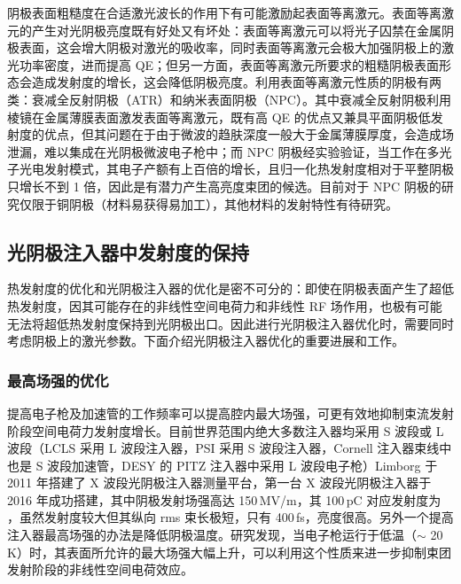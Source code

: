 阴极表面粗糙度在合适激光波长的作用下有可能激励起表面等离激元\cite{Novotny:2012aa}。表面等离激元的产生对光阴极亮度既有好处又有坏处：表面等离激元可以将光子囚禁在金属阴极表面，这会增大阴极对激光的吸收率，同时表面等离激元会极大加强阴极上的激光功率密度，进而提高 QE；但另一方面，表面等离激元所要求的粗糙阴极表面形态会造成发射度的增长，这会降低阴极亮度。利用表面等离激元性质的阴极有两类：衰减全反射阴极（ATR）和纳米表面阴极（NPC）。其中衰减全反射阴极利用棱镜在金属薄膜表面激发表面等离激元，既有高 QE 的优点又兼具平面阴极低发射度的优点，但其问题在于由于微波的趋肤深度一般大于金属薄膜厚度，会造成场泄漏，难以集成在光阴极微波电子枪中\cite{Watanabe:2011aa,Neo:2012aa}；而 NPC 阴极经实验验证，当工作在多光子光电发射模式\cite{Musumeci:2010aa}，其电子产额有上百倍的增长，且归一化热发射度相对于平整阴极只增长不到 1 倍\cite{Polyakov:2013ab,Li:2013ac}，因此是有潜力产生高亮度束团的候选。目前对于 NPC 阴极的研究仅限于铜阴极（材料易获得易加工），其他材料的发射特性有待研究。

\subsection{光阴极注入器中发射度的保持}
热发射度的优化和光阴极注入器的优化是密不可分的：即使在阴极表面产生了超低热发射度，因其可能存在的非线性空间电荷力和非线性 RF 场作用，也极有可能无法将超低热发射度保持到光阴极出口。因此进行光阴极注入器优化时，需要同时考虑阴极上的激光参数。下面介绍光阴极注入器优化的重要进展和工作。

\subsubsection{最高场强的优化}
提高电子枪及加速管的工作频率可以提高腔内最大场强，可更有效地抑制束流发射阶段空间电荷力发射度增长。目前世界范围内绝大多数注入器均采用 S 波段或 L 波段（LCLS 采用 L 波段注入器\cite{Zhou:2015aa}，PSI 采用 S 波段注入器\cite{prat2014emittance}，Cornell 注入器束线中也是 S 波段加速管\cite{Bartnik:2015aa}，DESY 的 PITZ 注入器中采用 L 波段电子枪\cite{Krasilnikov:2012aa}）Limborg 于 2011 年搭建了 X 波段光阴极注入器测量平台\cite{Limborg-Deprey:2011aa}，第一台 X 波段光阴极注入器于 2016 年成功搭建\cite{Limborg-Deprey:2016aa}，其中阴极发射场强高达 150\,MV/m，其 100\,pC 对应发射度为 ，虽然发射度较大但其纵向 rms 束长极短，只有 400\,fs，亮度很高。另外一个提高注入器最高场强的办法是降低阴极温度\cite{Rosenzweig:2016aa}。研究发现，当电子枪运行于低温（$\sim$ 20\,K）时，其表面所允许的最大场强大幅上升，可以利用这个性质来进一步抑制束团发射阶段的非线性空间电荷效应。

